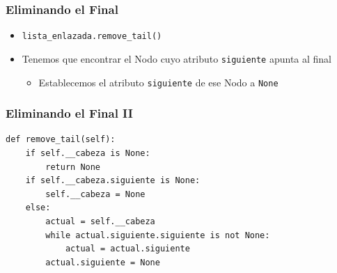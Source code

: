 \documentclass[11pt]{beamer}
\begin{document}
	\begin{frame}
		\frametitle{Eliminando el Final}
		\begin{itemize}
			\item \lstinline|lista_enlazada.remove_tail()|
			\item Tenemos que encontrar el Nodo cuyo atributo \texttt{siguiente} apunta al final
			\begin{itemize}
				\item Establecemos el atributo \texttt{siguiente} de ese Nodo a \lstinline|None|
			\end{itemize}
		\end{itemize}
		\vspace{0.7cm}
		\begin{center}
		\end{center}
	\end{frame}

	\begin{frame}[fragile]
		\frametitle{Eliminando el Final II}
\begin{lstlisting}
def remove_tail(self):
	if self.__cabeza is None:
		return None
	if self.__cabeza.siguiente is None:
		self.__cabeza = None
	else:
		actual = self.__cabeza
		while actual.siguiente.siguiente is not None:
			actual = actual.siguiente
		actual.siguiente = None
\end{lstlisting}
\end{frame}
\end{document}
